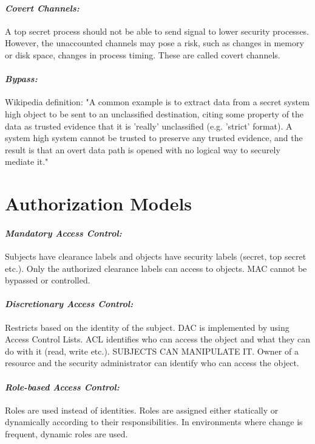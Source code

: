 \documentclass[11pt]{article} %
\begin{document}
\paragraph{\textit{Covert Channels:}} A top secret process should not be able to send signal to lower security processes.
However, the unaccounted channels may pose a risk, such as changes in memory or disk space, changes in process timing.
These are called covert channels.

\paragraph{\textit{Bypass:}} Wikipedia definition:
			"A common example is to extract data from a secret system high object to be sent to an unclassified destination, citing some property of the data as trusted evidence that it is 'really' unclassified (e.g. 'strict' format). A system high system cannot be trusted to preserve any trusted evidence, and the result is that an overt data path is opened with no logical way to securely mediate it." 


\section{Authorization Models}

\paragraph{\textit{Mandatory Access Control:}} Subjects have clearance labels and objects have security labels (secret, top secret etc.).
Only the authorized clearance labels can access to objects. MAC cannot be bypassed or controlled.

\paragraph{\textit{Discretionary Access Control:}} Restricts based on the identity of the subject.
DAC is implemented by using Access Control Lists.
ACL identifies who can access the object and what they can do with it (read, write etc.).
SUBJECTS CAN MANIPULATE IT.
Owner of a resource and the security administrator can identify who can access the object.

\paragraph{\textit{Role-based Access Control:}} Roles are used instead of identities.
Roles are assigned either statically or dynamically according to their responsibilities.
In environments where change is frequent, dynamic roles are used.
\end{document}
